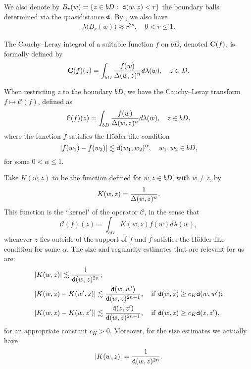 \documentclass[11pt,a4paper]{amsart}
\numberwithin{equation}{section}
\begin{document}
{We also denote by $ B_r(w) =\{ z\in bD:\ {\tt d}(w,z)<r \}$  the  boundary balls determined via the quasidistance ${\tt d }$.
By \cite[Proposition 3.5]{LS2014}, we also have
\begin{align}\label{lambdab-1}
\lambda\big(B_r(w) \big)\approx r^{2n},\quad 0<r\leq 1.
\end{align}


The Cauchy--Leray integral of a suitable function $f$ on $bD$, denoted ${\bf C}(f)$, is formally defined by
$$  {\bf C}(f)(z) =\int_{bD} {f(w)\over \Delta(w,z)^n}d\lambda(w),\quad z\in D. $$

When restricting $z$ to the boundary $bD$, we have the Cauchy--Leray transform $f\mapsto \mathcal C(f)$, defined as
$$  {\mathcal C}(f)(z) =\int_{bD} {f(w)\over \Delta(w,z)^n}d\lambda(w),\quad z\in bD, $$
where the function $f$ satisfies the H\"older-like condition
$$ |f(w_1)-f(w_2)|\lesssim {\tt d}(w_1,w_2)^\alpha,\quad %
 w_1,w_2\in bD, $$
  for some $0<\alpha\leq 1$.




Take $K(w,z)$ to be the function defined for $w,z\in bD$, with $w\not= z$, by
$$K(w,z) = {1\over \Delta(w,z)^n}.$$
This function is the ``kernel" of the operator  $\mathcal C$, in the sense that
$$  \mathcal C(f)(z)= \int_{bD} K(w,z)f(w)d\lambda(w), $$
whenever $z$ lies outside of the support of $f$ and $f$ satisfies the H\"older-like condition for some $\alpha$.
The size and regularity estimates that are relevant for us are:
\begin{align}\label{ck}
& |K(w,z)|\lesssim {1\over{\tt d}(w,z)^{2n}};\nonumber\\
& |K(w,z) - K(w',z)|\lesssim  { {\tt d}(w,w')\over  {\tt d}(w,z)^{2n+1} },\quad {\rm if}\ {\tt d}(w,z)\geq c_K{\tt d}(w,w');\\
& |K(w,z) - K(w,z')|\lesssim  { {\tt d}(z,z')\over  {\tt d}(w,z)^{2n+1} },\quad {\rm if}\ {\tt d}(w,z)\geq c_K {\tt d}(z,z'),\nonumber
\end{align}
for an appropriate constant $c_K>0$. Moreover, for the size estimates we actually have
\begin{align}\label{kd}
 |K(w,z)|= {1\over{\tt d}(w,z)^{2n}}.
 \end{align}

}
\end{document}

